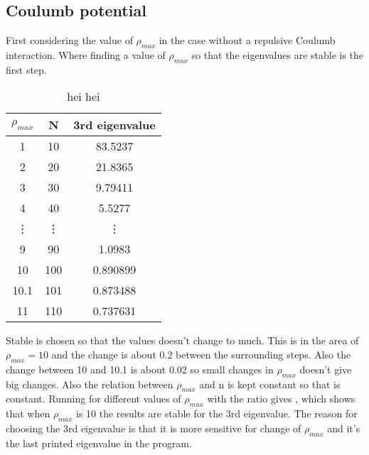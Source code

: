 
\subsection*{Coulumb potential}


First considering the value of $\rho_{max}$ in the case without a repulsive Coulumb interaction. Where finding a value of $\rho_{max}$ so that the eigenvalues are stable is the first step.   
\begin{wraptable}{r}{5.0cm}
\caption{hei hei} 
\label{tab:rhomax}
\phantom{.}
\begin{tabular}{|c|c|c|}
\hline
$\rho_{max}$ & N & 3rd eigenvalue \\
\hline 
1 & 10 & 83.5237 \\
2 & 20 & 21.8365 \\
3 & 30 & 9.79411 \\
4 & 40 & 5.5277 \\
\vdots & \vdots & \vdots \\
9 & 90 & 1.0983 \\
10 & 100 & 0.890899 \\
10.1 & 101 & 0.873488 \\
11 & 110 & 0.737631 \\
\hline

\end{tabular}

\end{wraptable}
Stable is chosen so that the values doesn't change to much. This is in the area of $\rho_{max} = 10$ and the change is about 0.2 between the surrounding steps. Also the change between 10 and 10.1 is about 0.02 so small changes in $\rho_{max} $ doesn't give big changes. Also the relation between $\rho_{max}$ and n is kept constant so that  is constant. Running for different values of $\rho_{max}$ with the ratio gives , which shows that when $\rho_{max} $ is 10 the results are stable for the 3rd eigenvalue. The reason for choosing the 3rd eigenvalue is that it is more sensitive for change of $\rho_{max}$ and it's the last printed eigenvalue in the program. 





